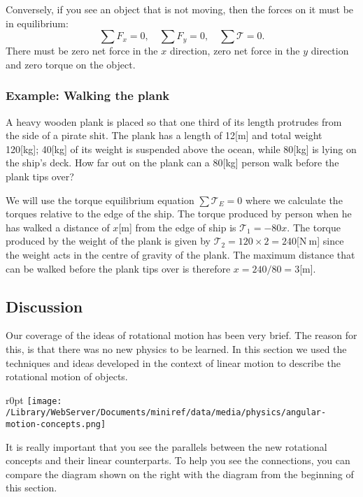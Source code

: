 \documentclass[letterpaper,9pt,journal]{IEEEtran}
\begin{document}
Conversely, if you see an object that is not moving, then the forces
on it must be in equilibrium: 
\[
 \sum F_x = 0, \quad  \sum F_y = 0,  \quad  \sum \mathcal{T} = 0.
\]
There must be zero net force in the $x$ direction, zero net force in 
the $y$ direction and zero torque on the object.


\subsubsection{Example: Walking the plank}

A heavy wooden plank is placed so that one third of its length
protrudes from the side of a pirate shit. 
The plank has a length of 12[m] and total weight 120[kg]; 
40[kg] of its weight is suspended above the ocean, 
while 80[kg] is lying on the ship's deck.
How far out on the plank can a 80[kg] person walk before 
the plank tips over?


We will use the torque equilibrium equation $\sum \mathcal{T}_E = 0$
where we calculate the torques relative to the edge of the ship.
The torque produced by person when he has walked a distance of
$x$[m] from the edge of ship is $\mathcal{T}_1 = -80x$.
The torque produced by the weight of the plank is given by 
$\mathcal{T}_2=120\times 2=240$[N$\:$m] since the weight acts
in the centre of gravity of the plank.
The maximum distance that can be walked before the plank tips
over is therefore $x=240/80=3$[m].

\vspace{-3mm}
\subsection{Discussion}
\label{bd8bc36eb41bc90c585ae7e902e9e284}%

Our coverage of the ideas of rotational motion has been very brief.
The reason for this, is that there was no new physics to be learned.
In this section we used the techniques and ideas developed in the
context of linear motion to describe the rotational motion of objects. 

\begin{wrapfigure}{r}{0pt}
\texttt{[image: /Library/WebServer/Documents/miniref/data/media/physics/angular-motion-concepts.png]}
\end{wrapfigure}

It is really important that you see the parallels between 
the new rotational concepts and their linear counterparts.
To help you see the connections, 
you can compare the diagram shown on the right with the diagram from the beginning of this section.
\end{document}
